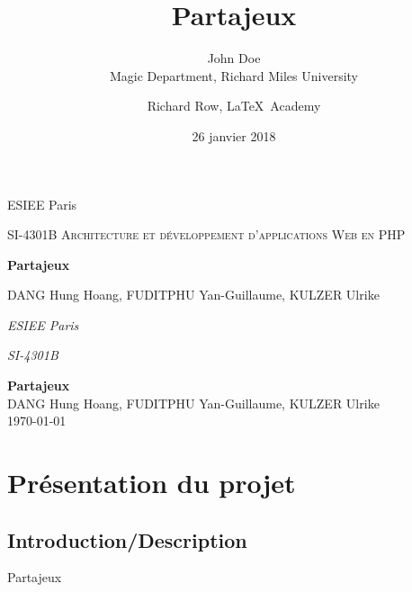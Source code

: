 \documentclass[a4paper,12pt,abstracton,titlepage]{scrartcl}
\title{Partajeux}
\date{26 janvier 2018}
\author{John Doe\\ Magic Department, Richard Miles University
        \and Richard Row, \LaTeX\ Academy}
\begin{document}

\begin{titlepage}
	\centering
	{\LARGE ESIEE Paris\par}
	\vspace{1cm}
	{\scshape\Large SI-4301B Architecture et développement d’applications Web en PHP\par}
	\vfill
	{\huge\bfseries Partajeux\par}
	\vfill
	{\large DANG Hung Hoang, FUDITPHU Yan-Guillaume, KULZER Ulrike\par}

\end{titlepage}



{\Large\noindent \emph{ESIEE Paris}}

{\Large\noindent \emph{SI-4301B}}
\vspace{1cm}
\begin{center}
	{\huge \textbf{Partajeux}
	\\
	\vspace{0.3cm}
	\large DANG Hung Hoang, FUDITPHU Yan-Guillaume, KULZER Ulrike
	\\
	\vspace{0.2cm}
	\today}
\end{center}
\vspace{1cm}
\tableofcontents

\setcounter{page}{1} %

\newpage
\section{Présentation du projet}
\subsection{Introduction/Description}
\vspace{0.2cm}
{\Large Partajeux\\}
\end{document}
